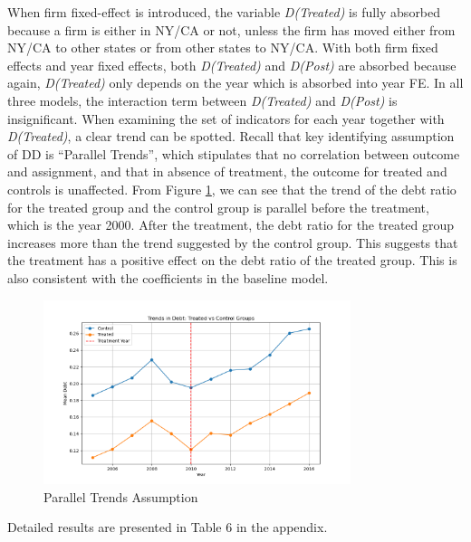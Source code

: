 \documentclass{article}
\begin{document}
When firm fixed-effect is introduced, the variable \textit{D(Treated)} is fully
absorbed because a firm is either in NY/CA or not, unless the firm has moved either from NY/CA to other states or
from other states to NY/CA. With both firm fixed effects and year fixed effects, both \textit{D(Treated)} and \textit{D(Post)} are absorbed
because again, \textit{D(Treated)} only depends on the year which is absorbed into year FE. In all three models, the interaction
term between \textit{D(Treated)} and \textit{D(Post)} is insignificant.
When examining the set of indicators for each year together with \textit{D(Treated)}, a clear trend can be spotted.
Recall that key identifying assumption of DD is “Parallel Trends”, which stipulates that no correlation between outcome
and assignment, and that in absence of treatment, the outcome for treated and controls is unaffected.
From Figure \ref{fig:parallel_trends}, we can see that the trend of the debt ratio for the treated group and the control group
is parallel before the treatment, which is the year 2000. After the treatment, the debt ratio for the treated group increases more than the trend
suggested by the control group. This suggests that the treatment has a positive effect on the debt ratio of the treated group.
This is also consistent with the coefficients in the baseline model.

\begin{figure}[h!]
    \centering
    \includegraphics[width=0.8\textwidth]{parallel_trends.png}
    \caption{Parallel Trends Assumption}
    \label{fig:parallel_trends}
\end{figure}

Detailed results are presented in Table 6 in the appendix.
\end{document}
